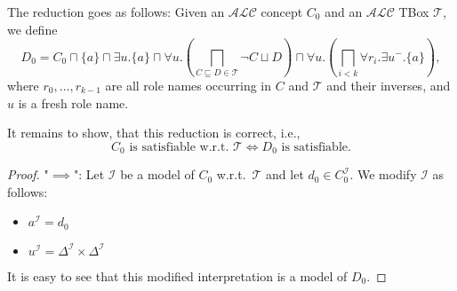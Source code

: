 The reduction goes as follows:
Given an $\mathcal{ALC}$ concept $C_0$ and an $\mathcal{ALC}$ TBox $\mathcal{T}$, we define
\[
	D_0 = C_0 \sqcap \{a\} \sqcap \exists u.\{a\} \sqcap \forall u.\left( \bigsqcap_{C \sqsubseteq D \in \mathcal{T}} \neg C \sqcup D \right) \sqcap \forall u.\left( \bigsqcap_{i<k} \forall r_i.\exists u^-.\{a\} \right)
,\]
where $r_0, \ldots, r_{k-1}$ are all role names occurring in $C$ and $\mathcal{T}$ and their inverses,
and $u$ is a fresh role name.

It remains to show, that this reduction is correct, i.e.,
\[
C_0 \text{ is satisfiable w.r.t.\ } \mathcal{T} \iff D_0 \text{ is satisfiable}
.\]

\begin{proof}
	"$ \implies$":
	Let $\mathcal{I}$ be a model of $C_0$ w.r.t.\ $\mathcal{T}$ and let $d_0 \in C_0^\mathcal{I}$.
	We modify $\mathcal{I}$ as follows:
	\begin{itemize}
		\item $a^\mathcal{I} = d_0$ 
		\item $u^\mathcal{I} = \Delta^\mathcal{I} \times \Delta^\mathcal{I}$
	\end{itemize}
	It is easy to see that this modified interpretation is a model of $D_0$.


\end{proof}
